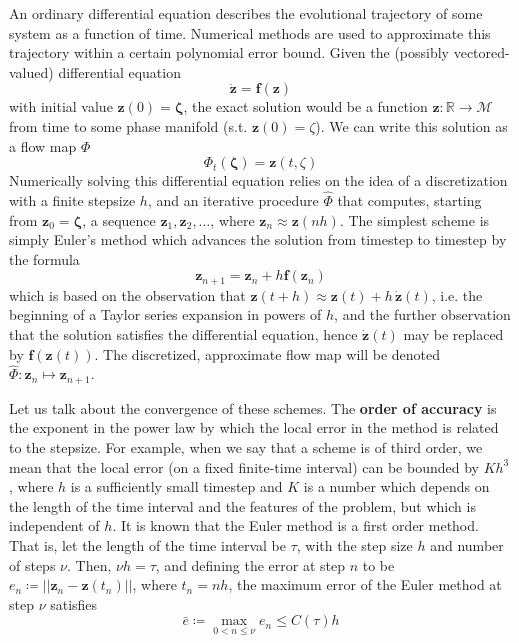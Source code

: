 \documentclass{article}
\begin{document}
    An ordinary differential equation describes the evolutional trajectory of some system as a function of time. Numerical methods are used to approximate this trajectory within a certain polynomial error bound. Given the (possibly vectored-valued) differential equation 
    \begin{equation}
      \mathbf{\dot{z}} = \mathbf{f}(\mathbf{z})
    \end{equation}
    with initial value $\mathbf{z}(0) = \boldsymbol{\zeta}$, the exact solution would be a function $\mathbf{z}: \mathbb{R} \longrightarrow \mathcal{M}$ from time to some phase manifold (s.t. $\mathbf{z}(0) = \zeta$). We can write this solution as a flow map $\Phi$
    \begin{equation}
      \Phi_t (\boldsymbol{\zeta}) = \mathbf{z}(t, \zeta)
    \end{equation}
    Numerically solving this differential equation relies on the idea of a discretization with a finite stepsize $h$, and an iterative procedure $\hat{\Phi}$ that computes, starting from $\mathbf{z}_0 = \boldsymbol{\zeta}$, a sequence $\mathbf{z}_1, \mathbf{z}_2, \ldots$, where $\mathbf{z}_n \approx \mathbf{z}(n h)$. The simplest scheme is simply Euler's method which advances the solution from timestep to timestep by the formula 
    \begin{equation}
      \mathbf{z}_{n+1} = \mathbf{z}_n + h \mathbf{f}(\mathbf{z}_n)
    \end{equation}
    which is based on the observation that $\mathbf{z}(t + h) \approx \mathbf{z}(t) + h\, \boldsymbol{\dot{z}}(t)$, i.e. the beginning of a Taylor series expansion in powers of $h$, and the further observation that the solution satisfies the differential equation, hence $\boldsymbol{\dot{z}}(t)$ may be replaced by $\mathbf{f}(\mathbf{z}(t))$. The discretized, approximate flow map will be denoted $\hat{\Phi}: \mathbf{z}_n \mapsto \mathbf{z}_{n+1}$. 

    Let us talk about the convergence of these schemes. The \textbf{order of accuracy} is the exponent in the power law by which the local error in the method is related to the stepsize. For example, when we say that a scheme is of third order, we mean that the local error (on a fixed finite-time interval) can be bounded by $K h^3$, where $h$ is a sufficiently small timestep and $K$ is a number which depends on the length of the time interval and the features of the problem, but which is independent of $h$. It is known that the Euler method is a first order method. That is, let the length of the time interval be $\tau$, with the step size $h$ and number of steps $\nu$. Then, $\nu h = \tau$, and defining the error at step $n$ to be $e_n \coloneqq ||\mathbf{z}_n - \mathbf{z}(t_n)||$, where $t_n = n h$, the maximum error of the Euler method at step $\nu$ satisfies
    \begin{equation}
      \bar{e} \coloneqq \max_{0 < n \leq \nu} e_n \leq C(\tau) h
    \end{equation}
\end{document}
